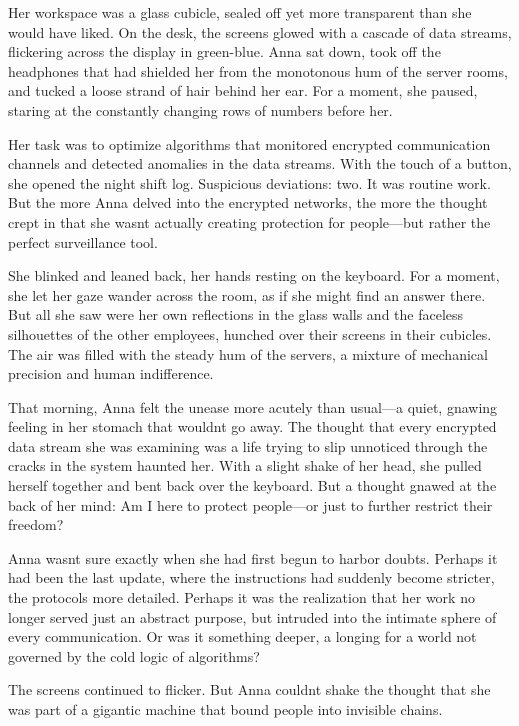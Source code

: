 \documentclass[
]{article}
\begin{document}
Her workspace was a glass cubicle, sealed off yet more transparent than she would have liked. On the desk, the screens glowed with a cascade of data streams, flickering across the display in green-blue. Anna sat down, took off the headphones that had shielded her from the monotonous hum of the server rooms, and tucked a loose strand of hair behind her ear. For a moment, she paused, staring at the constantly changing rows of numbers before her.

Her task was to optimize algorithms that monitored encrypted communication channels and detected anomalies in the data streams. With the touch of a button, she opened the night shift log. Suspicious deviations: two. It was routine work. But the more Anna delved into the encrypted networks, the more the thought crept in that she wasn\textquotesingle t actually creating protection for people---but rather the perfect surveillance tool.

She blinked and leaned back, her hands resting on the keyboard. For a moment, she let her gaze wander across the room, as if she might find an answer there. But all she saw were her own reflections in the glass walls and the faceless silhouettes of the other employees, hunched over their screens in their cubicles. The air was filled with the steady hum of the servers, a mixture of mechanical precision and human indifference.

That morning, Anna felt the unease more acutely than usual---a quiet, gnawing feeling in her stomach that wouldn\textquotesingle t go away. The thought that every encrypted data stream she was examining was a life trying to slip unnoticed through the cracks in the system haunted her. With a slight shake of her head, she pulled herself together and bent back over the keyboard. But a thought gnawed at the back of her mind: Am I here to protect people---or just to further restrict their freedom?

Anna wasn\textquotesingle t sure exactly when she had first begun to harbor doubts. Perhaps it had been the last update, where the instructions had suddenly become stricter, the protocols more detailed. Perhaps it was the realization that her work no longer served just an abstract purpose, but intruded into the intimate sphere of every communication. Or was it something deeper, a longing for a world not governed by the cold logic of algorithms?

The screens continued to flicker. But Anna couldn\textquotesingle t shake the thought that she was part of a gigantic machine that bound people into invisible chains.
\end{document}
